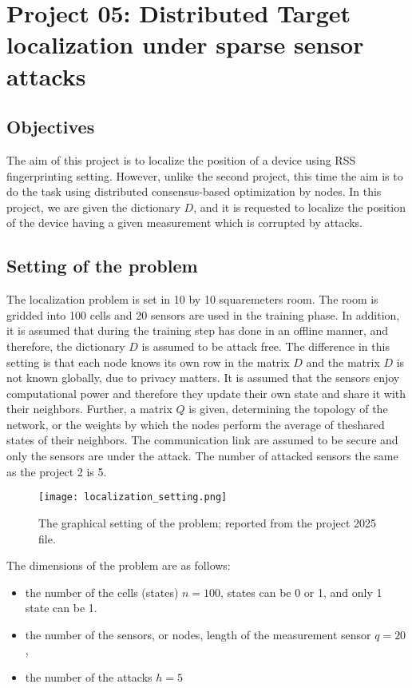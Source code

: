 \chapter{Project 05: Distributed Target localization under sparse sensor attacks}

\section{Objectives}
The aim of this project is to localize the position of a device using RSS fingerprinting setting. However, unlike the second project, this time the aim is to do the task using distributed consensus-based optimization by nodes. In this project, we are given the dictionary $D$, and it is requested to localize the position of the device having a given measurement which is corrupted by attacks.

\section{Setting of the problem}
The localization problem is set in 10 by 10 squaremeters room. The room is gridded into 100 cells and 20 sensors are used in the training phase. In addition, it is assumed that during the training step has done in an offline manner, and therefore, the dictionary $D$ is assumed to be attack free. The difference in this setting is that each node knows its own row in the matrix $D$ and the matrix $D$ is not known globally, due to privacy matters. It is assumed that the sensors enjoy computational power and therefore they update their own state and share it with their neighbors. Further, a matrix $Q$ is given, determining the topology of the network, or the weights by which the nodes perform the average of theshared states of their neighbors. The communication link are assumed to be secure and only the sensors are under the attack. The number of attacked sensors the same as the project 2 is 5.
\begin{figure}[H] %
    \centering
    \texttt{[image: localization\_setting.png]} %
    \caption{The graphical setting of the problem; reported from the project 2025 file.}
\end{figure}
The dimensions of the problem are as follows:
\begin{itemize}
	\item the number of the cells (states) $n = 100$,  states can be 0 or 1, and only 1 state can be 1.
	\item the number of the sensors, or nodes, length of the measurement sensor $q = 20$, 
	\item the number of the attacks $h = 5$
\end{itemize}

